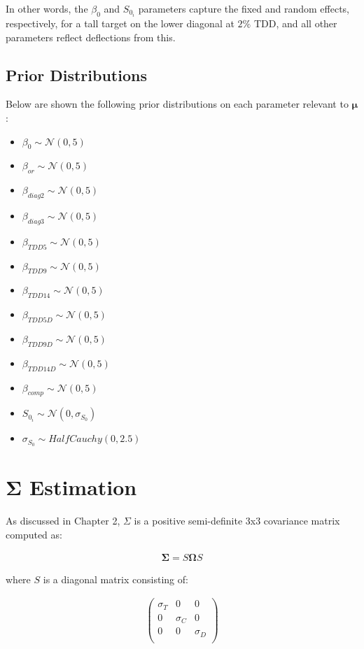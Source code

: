 {In other words, the $\beta_{0}$ and $S_{0}_{i}$ parameters capture the fixed and random effects, respectively, for a tall target on the lower diagonal at $2\%$ TDD, and all other parameters reflect deflections from this.

\subsection{Prior Distributions}
Below are shown the following prior distributions on each parameter relevant to $\mathbf{\mu}$:
\begin{itemize}
    \item $\beta_{0} \sim \mathcal{N}(0,5)$
    \item $\beta_{or} \sim \mathcal{N}(0,5)$
    \item $\beta_{diag2} \sim \mathcal{N}(0,5)$
    \item $\beta_{diag3} \sim \mathcal{N}(0,5)$
    \item $\beta_{TDD5} \sim \mathcal{N}(0,5)$
    \item $\beta_{TDD9} \sim \mathcal{N}(0,5)$
    \item $\beta_{TDD14} \sim \mathcal{N}(0,5)$
    \item $\beta_{TDD5D} \sim \mathcal{N}(0,5)$
    \item $\beta_{TDD9D} \sim \mathcal{N}(0,5)$
    \item $\beta_{TDD14D} \sim \mathcal{N}(0,5)$
    \item $\beta_{comp} \sim \mathcal{N}(0,5)$
    \item $S_{0}_{i} \sim \mathcal{N}(0,\sigma_{S}_{0})$
    \item $\sigma_{S}_{0} \sim HalfCauchy(0,2.5)$
\end{itemize}

\section{$\mathbf{\Sigma}$ Estimation}
As discussed in Chapter 2, $\Sigma$ is a positive semi-definite 3x3 covariance matrix computed as:

\begin{align}
   \mathbf{\Sigma}=S\mathbf{\Omega}S
   \label{eqn:Sigma}
\end{align}

where $S$ is a diagonal matrix consisting of: 

\begin{align}
   \begin{pmatrix}
      \sigma_{T} & 0 & 0 \\
      0 & \sigma_{C} & 0 \\
      0 & 0 & \sigma_{D} \\
   \end{pmatrix}
   \label{eqn:S}
\end{align}

}

